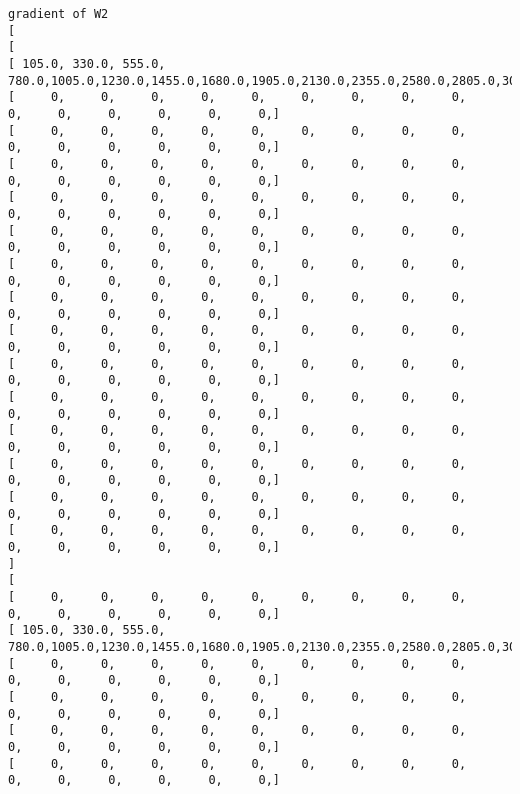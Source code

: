 \documentclass[11pt]{article}
\begin{document}
\begin{Verbatim}[commandchars=\\\{\}]
gradient of W2
[
[
[  105.0,  330.0,  555.0,  780.0, 1005.0, 1230.0, 1455.0, 1680.0, 1905.0, 2130.0, 2355.0, 2580.0, 2805.0, 3030.0, 3255.0, ]
[      0,      0,      0,      0,      0,      0,      0,      0,      0,      0,      0,      0,      0,      0,      0, ]
[      0,      0,      0,      0,      0,      0,      0,      0,      0,      0,      0,      0,      0,      0,      0, ]
[      0,      0,      0,      0,      0,      0,      0,      0,      0,      0,      0,      0,      0,      0,      0, ]
[      0,      0,      0,      0,      0,      0,      0,      0,      0,      0,      0,      0,      0,      0,      0, ]
[      0,      0,      0,      0,      0,      0,      0,      0,      0,      0,      0,      0,      0,      0,      0, ]
[      0,      0,      0,      0,      0,      0,      0,      0,      0,      0,      0,      0,      0,      0,      0, ]
[      0,      0,      0,      0,      0,      0,      0,      0,      0,      0,      0,      0,      0,      0,      0, ]
[      0,      0,      0,      0,      0,      0,      0,      0,      0,      0,      0,      0,      0,      0,      0, ]
[      0,      0,      0,      0,      0,      0,      0,      0,      0,      0,      0,      0,      0,      0,      0, ]
[      0,      0,      0,      0,      0,      0,      0,      0,      0,      0,      0,      0,      0,      0,      0, ]
[      0,      0,      0,      0,      0,      0,      0,      0,      0,      0,      0,      0,      0,      0,      0, ]
[      0,      0,      0,      0,      0,      0,      0,      0,      0,      0,      0,      0,      0,      0,      0, ]
[      0,      0,      0,      0,      0,      0,      0,      0,      0,      0,      0,      0,      0,      0,      0, ]
[      0,      0,      0,      0,      0,      0,      0,      0,      0,      0,      0,      0,      0,      0,      0, ]
]
[
[      0,      0,      0,      0,      0,      0,      0,      0,      0,      0,      0,      0,      0,      0,      0, ]
[  105.0,  330.0,  555.0,  780.0, 1005.0, 1230.0, 1455.0, 1680.0, 1905.0, 2130.0, 2355.0, 2580.0, 2805.0, 3030.0, 3255.0, ]
[      0,      0,      0,      0,      0,      0,      0,      0,      0,      0,      0,      0,      0,      0,      0, ]
[      0,      0,      0,      0,      0,      0,      0,      0,      0,      0,      0,      0,      0,      0,      0, ]
[      0,      0,      0,      0,      0,      0,      0,      0,      0,      0,      0,      0,      0,      0,      0, ]
[      0,      0,      0,      0,      0,      0,      0,      0,      0,      0,      0,      0,      0,      0,      0, ]

\end{Verbatim}
\end{document}
